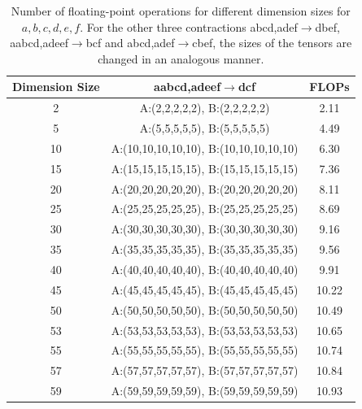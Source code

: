 \begingroup
\scriptsize
\captionsetup{font=scriptsize}

\begin{table}[H]
    \centering
    {\tiny
    \caption{Number of floating-point operations for different dimension sizes for $a,b,c,d,e,f$. For the other three contractions abcd,adef$\rightarrow$dbef, aabcd,adeef$\rightarrow$bcf and abcd,adef$\rightarrow$cbef, the sizes of the tensors are changed in an analogous manner.}
    \label{tab:dimensions}
    \begin{tabular}{ccc}  
        \toprule
        \textbf{Dimension Size} & \textbf{aabcd,adeef}$\rightarrow$\textbf{dcf} & \textbf{FLOPs} \\
        \midrule
        2  & A:(2,2,2,2,2), B:(2,2,2,2,2) & 2.11  \\
        5  & A:(5,5,5,5,5), B:(5,5,5,5,5) & 4.49  \\
        10 & A:(10,10,10,10,10), B:(10,10,10,10,10) & 6.30  \\
        15 & A:(15,15,15,15,15), B:(15,15,15,15,15) & 7.36  \\
        20 & A:(20,20,20,20,20), B:(20,20,20,20,20) & 8.11  \\
        25 & A:(25,25,25,25,25), B:(25,25,25,25,25) & 8.69  \\
        30 & A:(30,30,30,30,30), B:(30,30,30,30,30) & 9.16  \\
        35 & A:(35,35,35,35,35), B:(35,35,35,35,35) & 9.56  \\
        40 & A:(40,40,40,40,40), B:(40,40,40,40,40) & 9.91  \\
        45 & A:(45,45,45,45,45), B:(45,45,45,45,45) & 10.22 \\
        50 & A:(50,50,50,50,50), B:(50,50,50,50,50) & 10.49 \\
        53 & A:(53,53,53,53,53), B:(53,53,53,53,53) & 10.65 \\
        55 & A:(55,55,55,55,55), B:(55,55,55,55,55) & 10.74 \\
        57 & A:(57,57,57,57,57), B:(57,57,57,57,57) & 10.84 \\
        59 & A:(59,59,59,59,59), B:(59,59,59,59,59) & 10.93 \\
        \bottomrule
    \end{tabular}}
\end{table}


